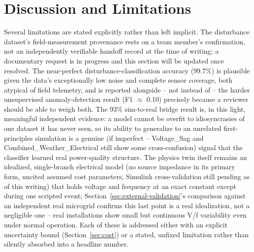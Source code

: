 \documentclass[conference]{IEEEtran}
\begin{document}
\section{Discussion and Limitations}
\label{sec:limitations}
Several limitations are stated explicitly rather than left implicit.
The disturbance dataset's field-measurement provenance rests on a
team member's confirmation, not an independently verifiable handoff
record at the time of writing; a documentary request is in progress
and this section will be updated once resolved. The near-perfect
disturbance-classification accuracy (99.7\%) is plausible given the
data's exceptionally low noise and complete sensor coverage, both
atypical of field telemetry, and is reported alongside -- not instead
of -- the harder unsupervised anomaly-detection result (F1 $\approx$
0.10) precisely because a reviewer should be able to weigh both. The
93\% sim-to-real bridge result is, in this light, meaningful
independent evidence: a model cannot be overfit to idiosyncrasies of
one dataset it has never seen, so its ability to generalize to an
unrelated first-principles simulation is a genuine (if imperfect --
Voltage\_Sag and Combined\_Weather\_Electrical still show some
cross-confusion) signal that the classifier learned real
power-quality structure. The physics twin itself remains an
idealized, single-branch electrical model (no source impedance in
its primary form, uncited assumed cost parameters, Simulink
cross-validation still pending as of this writing) that holds voltage
and frequency at an exact constant except during one scripted event;
Section~\ref{sec:external-validation}'s comparison against an
independent real microgrid confirms this last point is a real
idealization, not a negligible one -- real installations show small
but continuous V/f variability even under normal operation. Each of
these is addressed either with an explicit uncertainty bound
(Section~\ref{sec:cost}) or a stated, unfixed limitation rather than
silently absorbed into a headline number.
\end{document}
